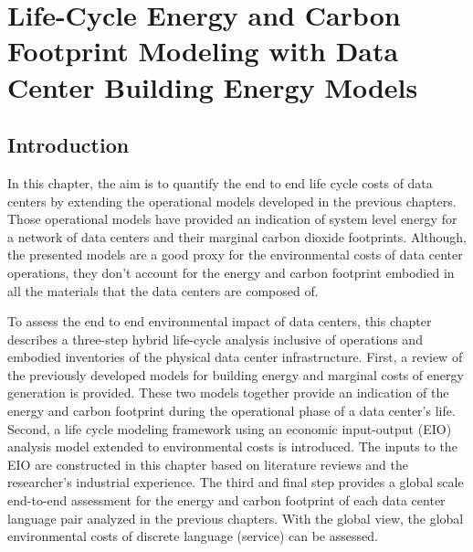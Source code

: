 \chapter{Life-Cycle Energy and Carbon Footprint Modeling with Data Center Building Energy Models}
\label{chp:embodied_cost_model}

\section{Introduction}
    In this chapter, the aim is to quantify the end to end life cycle costs of data centers by extending the operational models developed in the previous chapters. Those operational models have provided an indication of system level energy for a network of data centers and their marginal carbon dioxide footprints. Although, the presented models are a good proxy for the environmental costs of data center operations, they don't account for the energy and carbon footprint embodied in all the materials that the data centers are composed of.

    To assess the end to end environmental impact of data centers, this chapter describes a three-step hybrid life-cycle analysis inclusive of operations and embodied inventories of the physical data center infrastructure. First, a review of the previously developed models for building energy and marginal costs of energy generation is provided. These two models together provide an indication of the energy and carbon footprint during the operational phase of a data center's life. Second, a life cycle modeling framework using an economic input-output (EIO) analysis model extended to environmental costs is introduced. The inputs to the EIO are constructed in this chapter based on literature reviews and the researcher's industrial experience. The third and final step provides a global scale end-to-end assessment for the energy and carbon footprint of each data center language pair analyzed in the previous chapters. With the global view, the global environmental costs of discrete language (service) can be assessed.

